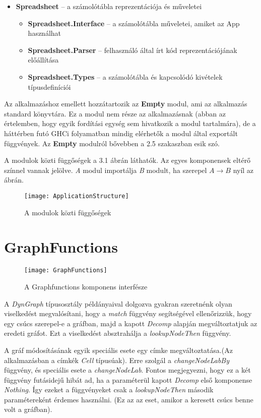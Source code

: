 \begin{itemize}
	\item \textbf{Spreadsheet} -- a számolótábla reprezentációja és műveletei
	\begin{itemize}
		\item \textbf{Spreadsheet.Interface} -- a számolótábla műveletei, amiket az App használhat
		\item \textbf{Spreadsheet.Parser} -- felhasználó által írt kód reprezentációjának előállítása
		\item \textbf{Spreadsheet.Types} -- a számolótábla és kapcsolódó kivételek típusdefiníciói
	\end{itemize}
\end{itemize} 

Az alkalmazáshoz emellett hozzátartozik az \textbf{Empty} modul, ami az alkalmazás standard könyvtára. Ez a modul nem része az alkalmazásnak (abban az értelemben, hogy egyik fordítási egység sem hivatkozik a modul tartalmára), de a háttérben futó GHCi folyamatban mindig elérhetők a modul által exportált függvények. Az \textbf{Empty} modulról bővebben a 2.5 szakaszban esik szó.

A modulok közti függőségek a 3.1 ábrán láthatók. Az egyes komponensek eltérő színnel vannak jelölve. \textit{A} modul importálja \textit{B} modult, ha szerepel $A \rightarrow B$ nyíl az ábrán. 

\begin{figure}[H]
	\centering
	\texttt{[image: ApplicationStructure]}
	\caption{A modulok közti függőségek}
	\label{fig:appstructure}
\end{figure}

\section{GraphFunctions}

\begin{figure}[H]
	\centering
	\texttt{[image: GraphFunctions]}
	\caption{A Graphfunctions komponens interfésze}
	\label{fig:appstructure}
\end{figure}

A \textit{DynGraph} típusosztály példányaival dolgozva gyakran szeretnénk olyan viselkedést megvalósítani, hogy a \textit{match} függvény segítségével ellenőrizzük, hogy egy csúcs szerepel-e a gráfban, majd a kapott \textit{Decomp} alapján megváltoztatjuk az eredeti gráfot. Ezt a viselkedést absztrahálja a \textit{lookupNodeThen} függvény. 

A gráf módosításának egyik speciális esete egy címke megváltoztatása.(Az alkalmazásban a címkék \textit{Cell} típusúak). Erre szolgál a \textit{changeNodeLabBy} függvény, és speciális esete a \textit{changeNodeLab}. Fontos megjegyezni, hogy ez a két függvény futásidejű hibát ad, ha a paraméterül kapott \textit{Decomp} első komponense \textit{Nothing}. Így ezeket a függvényeket csak a \textit{lookupNodeThen} második paramétereként érdemes használni. (Ez az az eset, amikor a keresett csúcs benne volt a gráfban).

